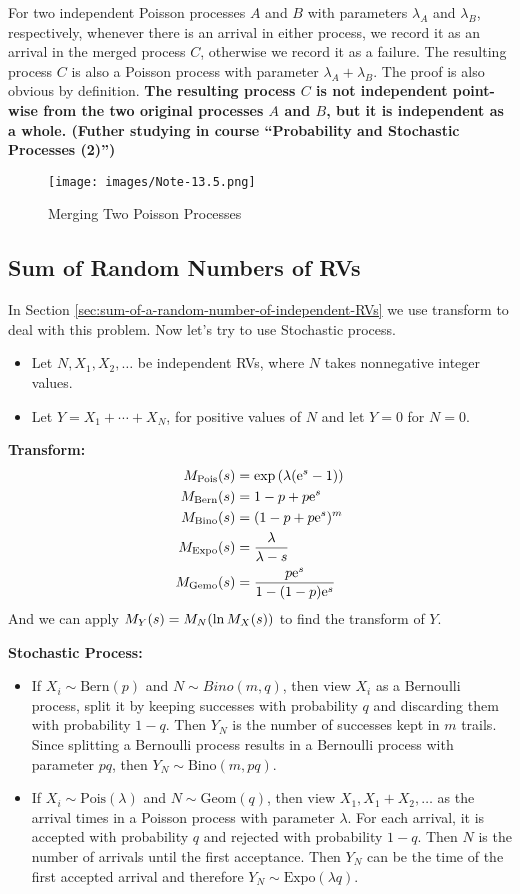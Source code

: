 For two independent Poisson processes $A$ and $B$ with parameters $\lambda_A$ and $\lambda_B$, respectively, whenever there is an arrival in either process, we record it as an arrival in the merged process $C$, otherwise we record it as a failure. The resulting process $C$ is also a Poisson process with parameter $\lambda_A + \lambda_B$. The proof is also obvious by definition. \textbf{The resulting process $C$ is not independent point-wise from the two original processes $A$ and $B$, but it is independent as a whole. (Futher studying in course ``Probability and Stochastic Processes (2)'')}
\begin{figure}[H]
    \centering
    \texttt{[image: images/Note-13.5.png]}
    \caption{Merging Two Poisson Processes}
\end{figure}

\subsection{Sum of Random Numbers of RVs}
In Section \ref{sec:sum-of-a-random-number-of-independent-RVs} we use transform to deal with this problem. Now let's try to use Stochastic process.
\begin{itemize}
    \item Let $N, X_1, X_2, \ldots$ be independent RVs, where $N$ takes nonnegative integer values.
    \item Let $Y = X_1 + \cdots + X_N$, for positive values of $N$ and let $Y = 0$ for $N = 0$.
\end{itemize}

\textbf{Transform:}
\begin{align}
    M_\text{Pois}(s) &= \exp\qty(\lambda (\mathrm{e}^s - 1)) \\ 
    M_\text{Bern}(s) &= 1 - p + p\mathrm{e}^s \\ 
    M_\text{Bino}(s) &= (1 - p + p\mathrm{e}^s)^m \\
    M_\text{Expo}(s) &= \frac{\lambda}{\lambda - s} \\ 
    M_\text{Gemo}(s) &= \frac{p \mathrm{e}^s}{1 - (1-p)\mathrm{e}^s}
\end{align}
\indent And we can apply $M_Y(s) = M_N\qty(\ln M_X(s))$ to find the transform of $Y$.

\textbf{Stochastic Process:}
\begin{itemize}
    \item  If $X_i \sim \text{Bern}(p)$ and $N \sim Bino(m, q)$, then view $X_i$ as a Bernoulli process, split it by keeping successes with probability $q$ and discarding them with probability $1-q$. Then $Y_N$ is the number of successes kept in $m$ trails. Since splitting a Bernoulli process results in a Bernoulli process with parameter $pq$, then $Y_N \sim \text{Bino}(m, pq)$.
    \item If $X_i \sim \text{Pois}(\lambda)$ and $N \sim \text{Geom}(q)$, then view $X_1, X_1 + X_2, \ldots$ as the arrival times in a Poisson process with parameter $\lambda$. For each arrival, it is accepted with probability $q$ and rejected with probability $1-q$. Then $N$ is the number of arrivals until the first acceptance. Then $Y_N$ can be the time of the first accepted arrival and therefore $Y_N \sim \text{Expo}(\lambda q)$.
\end{itemize}

